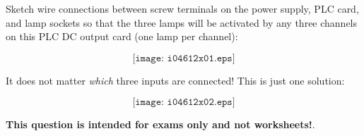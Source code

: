 

Sketch wire connections between screw terminals on the power supply, PLC card, and lamp sockets so that the three lamps will be activated by any three channels on this PLC DC output card (one lamp per channel):

$$\texttt{[image: i04612x01.eps]}$$







It does not matter {\it which} three inputs are connected!  This is just one solution:

$$\texttt{[image: i04612x02.eps]}$$







{\bf This question is intended for exams only and not worksheets!}.


